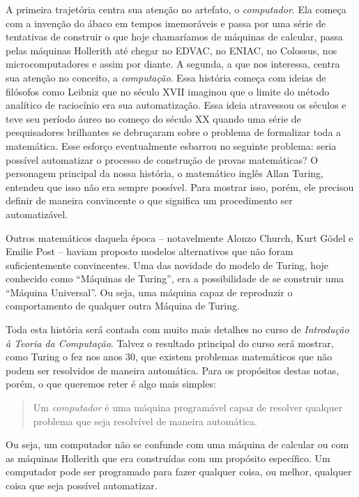 A primeira trajetória centra sua atenção no artefato, o {\em computador}.
Ela começa com a invenção do ábaco em tempos imemoráveis e passa por uma série de tentativas de construir o que hoje chamaríamos de máquinas de calcular, passa pelas máquinas Hollerith até chegar no EDVAC, no ENIAC, no Colossus, nos microcomputadores e assim por diante.
A segunda, a que nos interessa, centra sua atenção no conceito, a {\em computação}.
Essa história começa com ideias de filósofos como Leibniz que no século XVII imaginou que o limite do método analítico de raciocínio era sua automatização.
Essa ideia atravessou os séculos e teve seu período áureo no começo do século XX quando uma série de pesquisadores brilhantes se debruçaram sobre o problema de formalizar toda a matemática.
Esse esforço eventualmente esbarrou no seguinte problema: seria possível automatizar o processo de construção de provas matemáticas?
O personagem principal da nossa história, o matemático inglês Allan Turing, entendeu que isso não era sempre possível.
Para mostrar isso, porém, ele precisou definir de maneira convincente o que significa um procedimento ser automatizável.

Outros matemáticos daquela época -- notavelmente Alonzo Church, Kurt Gödel e Emilie Post -- haviam proposto modelos alternativos que não foram suficientemente convincentes.
Uma das novidade do modelo de Turing, hoje conhecido como ``Máquinas de Turing'', era a possibilidade de se construir uma ``Máquina Universal''.
Ou seja, uma máquina capaz de reproduzir o comportamento de qualquer outra Máquina de Turing.

Toda esta história será contada com muito mais detalhes no curso de {\em Introdução à Teoria da Computação}.
Talvez o resultado principal do curso será mostrar, como Turing o fez nos anos 30, que existem problemas matemáticos que não podem ser resolvidos de maneira automática.
Para os propósitos destas notas, porém, o que queremos reter é algo mais simples:

\begin{quote}
  Um {\em computador} é uma máquina programável capaz de resolver qualquer problema que seja resolvível de maneira automática.
\end{quote}

Ou seja, um computador não se confunde com uma máquina de calcular ou com as máquinas Hollerith que era construídas com um propósito específico.
Um computador pode ser programado para fazer qualquer coisa, ou melhor, qualquer coisa que seja possível automatizar.

